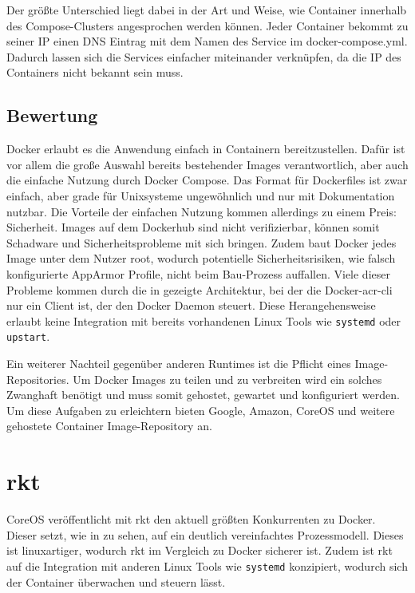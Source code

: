 Der größte Unterschied liegt dabei in der Art und Weise, wie Container innerhalb des Compose-Clusters angesprochen werden können. Jeder Container bekommt zu seiner IP einen DNS Eintrag mit dem Namen des Service im docker-compose.yml. Dadurch lassen sich die Services einfacher miteinander verknüpfen, da die IP des Containers nicht bekannt sein muss.

\subsection{Bewertung}
\label{sec:compDockerBewertung}
Docker erlaubt es die Anwendung einfach in Containern bereitzustellen. Dafür ist vor allem die große Auswahl bereits bestehender Images verantwortlich, aber auch die einfache Nutzung durch Docker Compose. Das Format für Dockerfiles ist zwar einfach, aber grade für Unixsysteme ungewöhnlich und nur mit Dokumentation nutzbar. Die Vorteile der einfachen Nutzung kommen allerdings zu einem Preis: Sicherheit. Images auf dem Dockerhub sind nicht verifizierbar, können somit Schadware und Sicherheitsprobleme mit sich bringen. Zudem baut Docker jedes Image unter dem Nutzer root, wodurch potentielle Sicherheitsrisiken, wie falsch konfigurierte AppArmor Profile, nicht beim Bau-Prozess auffallen. Viele dieser Probleme kommen durch die in  gezeigte Architektur, bei der die Docker-\gls{acr-cli} nur ein Client ist, der den Docker Daemon steuert. Diese Herangehensweise erlaubt keine Integration mit bereits vorhandenen Linux Tools wie \texttt{systemd} oder \texttt{upstart}.

Ein weiterer Nachteil gegenüber anderen Runtimes ist die Pflicht eines Image-Repositories. Um Docker Images zu teilen und zu verbreiten wird ein solches Zwanghaft benötigt und muss somit gehostet, gewartet und konfiguriert werden. Um diese Aufgaben zu erleichtern bieten Google, Amazon, CoreOS und weitere gehostete Container Image-Repository an.

\section{rkt}
\label{sec:compRkt}

CoreOS veröffentlicht mit rkt den aktuell größten Konkurrenten zu Docker. Dieser setzt, wie in  zu sehen, auf ein deutlich vereinfachtes Prozessmodell. Dieses ist linuxartiger, wodurch rkt im Vergleich zu Docker sicherer ist. Zudem ist rkt auf die Integration mit anderen Linux Tools wie \texttt{systemd} konzipiert, wodurch sich der Container überwachen und steuern lässt.

